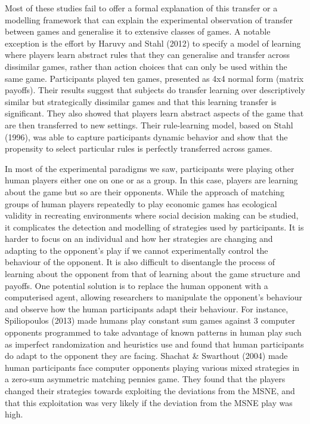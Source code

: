 \documentclass[,man,floatsintext]{apa6}
\begin{document}
Most of these studies fail to offer a formal explanation of this transfer or a modelling framework that can explain the experimental observation of transfer between games and generalise it to extensive classes of games. A notable exception is the effort by Haruvy and Stahl (2012) to specify a model of learning where players learn abstract rules that they can generalise and transfer across dissimilar games, rather than action choices that can only be used within the same game. Participants played ten games, presented as 4x4 normal form (matrix payoffs). Their results suggest that subjects do transfer learning over descriptively similar but strategically dissimilar games and that this learning transfer is significant. They also showed that players learn abstract aspects of the game that are then transferred to new settings. Their rule-learning model, based on Stahl (1996), was able to capture participants dynamic behavior and show that the propensity to select particular rules is perfectly transferred across games.

In most of the experimental paradigms we saw, participants were playing other human players either one on one or as a group. In this case, players are learning about the game but so are their opponents. While the approach of matching groups of human players repeatedly to play economic games has ecological validity in recreating environments where social decision making can be studied, it complicates the detection and modelling of strategies used by participants. It is harder to focus on an individual and how her strategies are changing and adapting to the opponent's play if we cannot experimentally control the behaviour of the opponent. It is also difficult to disentangle the process of learning about the opponent from that of learning about the game structure and payoffs. One potential solution is to replace the human opponent with a computerised agent, allowing researchers to manipulate the opponent's behaviour and observe how the human participants adapt their behaviour. For instance, Spiliopoulos (2013) made humans play constant sum games against 3 computer opponents programmed to take advantage of known patterns in human play such as imperfect randomization and heuristics use and found that human participants do adapt to the opponent they are facing. Shachat \& Swarthout (2004) made human participants face computer opponents playing various mixed strategies in a zero-sum asymmetric matching pennies game. They found that the players changed their strategies towards exploiting the deviations from the MSNE, and that this exploitation was very likely if the deviation from the MSNE play was high.
\end{document}
